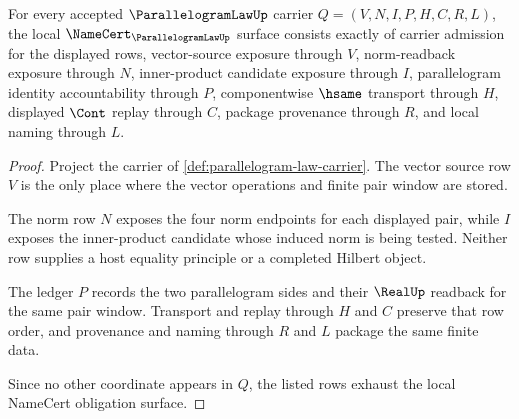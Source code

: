 \begin{theorem}
\label{thm:parallelogram-law-namecert-obligations}
For every accepted $\ParallelogramLawUp$ carrier $Q=(V,N,I,P,H,C,R,L)$, the local $\NameCert_{\ParallelogramLawUp}$ surface consists exactly of carrier admission for the displayed rows, vector-source exposure through $V$, norm-readback exposure through $N$, inner-product candidate exposure through $I$, parallelogram identity accountability through $P$, componentwise $\hsame$ transport through $H$, displayed $\Cont$ replay through $C$, package provenance through $R$, and local naming through $L$.
\end{theorem}
\begin{proof}
Project the carrier of \autoref{def:parallelogram-law-carrier}. The vector source row $V$ is the only place where the vector operations and finite pair window are stored.

The norm row $N$ exposes the four norm endpoints for each displayed pair, while $I$ exposes the inner-product candidate whose induced norm is being tested. Neither row supplies a host equality principle or a completed Hilbert object.

The ledger $P$ records the two parallelogram sides and their $\RealUp$ readback for the same pair window. Transport and replay through $H$ and $C$ preserve that row order, and provenance and naming through $R$ and $L$ package the same finite data.

Since no other coordinate appears in $Q$, the listed rows exhaust the local NameCert obligation surface.
\end{proof}

